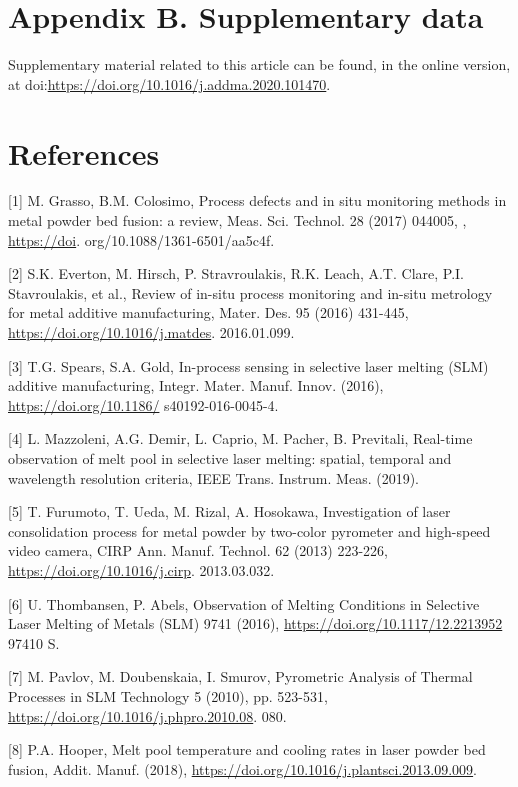 \documentclass[10pt]{article}
\begin{document}
\section*{Appendix B. Supplementary data}
Supplementary material related to this article can be found, in the online version, at doi:\href{https://doi.org/10.1016/j.addma.2020.101470}{https://doi.org/10.1016/j.addma.2020.101470}.

\section*{References}
[1] M. Grasso, B.M. Colosimo, Process defects and in situ monitoring methods in metal powder bed fusion: a review, Meas. Sci. Technol. 28 (2017) 044005, , \href{https://doi}{https://doi}. org/10.1088/1361-6501/aa5c4f.

[2] S.K. Everton, M. Hirsch, P. Stravroulakis, R.K. Leach, A.T. Clare, P.I. Stavroulakis, et al., Review of in-situ process monitoring and in-situ metrology for metal additive manufacturing, Mater. Des. 95 (2016) 431-445, \href{https://doi.org/10.1016/j.matdes}{https://doi.org/10.1016/j.matdes}. 2016.01.099.

[3] T.G. Spears, S.A. Gold, In-process sensing in selective laser melting (SLM) additive manufacturing, Integr. Mater. Manuf. Innov. (2016), \href{https://doi.org/10.1186/}{https://doi.org/10.1186/} s40192-016-0045-4.

[4] L. Mazzoleni, A.G. Demir, L. Caprio, M. Pacher, B. Previtali, Real-time observation of melt pool in selective laser melting: spatial, temporal and wavelength resolution criteria, IEEE Trans. Instrum. Meas. (2019).

[5] T. Furumoto, T. Ueda, M. Rizal, A. Hosokawa, Investigation of laser consolidation process for metal powder by two-color pyrometer and high-speed video camera, CIRP Ann. Manuf. Technol. 62 (2013) 223-226, \href{https://doi.org/10.1016/j.cirp}{https://doi.org/10.1016/j.cirp}. 2013.03.032.

[6] U. Thombansen, P. Abels, Observation of Melting Conditions in Selective Laser Melting of Metals (SLM) 9741 (2016), \href{https://doi.org/10.1117/12.2213952}{https://doi.org/10.1117/12.2213952} 97410 S.

[7] M. Pavlov, M. Doubenskaia, I. Smurov, Pyrometric Analysis of Thermal Processes in SLM Technology 5 (2010), pp. 523-531, \href{https://doi.org/10.1016/j.phpro.2010.08}{https://doi.org/10.1016/j.phpro.2010.08}. 080.

[8] P.A. Hooper, Melt pool temperature and cooling rates in laser powder bed fusion, Addit. Manuf. (2018), \href{https://doi.org/10.1016/j.plantsci.2013.09.009}{https://doi.org/10.1016/j.plantsci.2013.09.009}.
\end{document}
